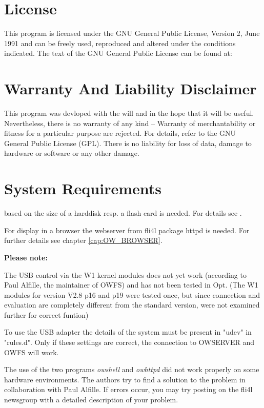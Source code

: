 \section{License}
This program is licensed under the GNU General Public License, Version 2, June 1991
and can be freely used, reproduced and altered under the conditions indicated.
The text of the GNU General Public License can be found at:

\section{Warranty And Liability Disclaimer}
This program was devloped with the will and in the hope
that it will be useful. Nevertheless, there is no warranty of any kind --
Warranty of merchantability or fitness for a particular purpose are rejected.
For details, refer to the GNU General Public License (GPL).
There is no liability for loss of data, damage to hardware or software or any other damage.

\section{System Requirements}
 based on the size of  a harddisk resp. a flash card is needed.
For details see .

For display in a browser the webserver from fli4l package \glqq{}httpd\grqq{} is
needed. For further details see chapter \ref{cap:OW_BROWSER}.

\textbf{Please note:}

The USB control via the W1 kernel modules does not yet work (according to Paul Alfille,
the maintainer of OWFS) and has not been tested in Opt.
(The W1 modules for version V2.8 p16 and p19 were tested once, but since
connection and evaluation are completely different from the standard version,
were not examined further for correct funtion)

To use the USB adapter the details of the system must be present in "udev" in "rules.d".
Only if these settings are correct, the connection to OWSERVER and OWFS will work.

The use of the two programs \emph{owshell} and \emph{owhttpd} did not work
properly on some hardware environments. The authors try to find a solution to
the problem in collaboration with Paul Alfille. If errors occur, you may try posting
on the fli4l newsgroup with a detailed description of your problem.

